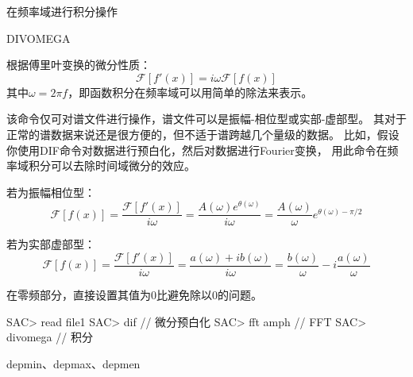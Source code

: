 \label{cmd:divomega}

在频率域进行积分操作

\begin{SACSTX}
DIVOMEGA
\end{SACSTX}

根据傅里叶变换的微分性质：
\[
\mathcal{F}[f'(x)]= i \omega \mathcal{F}[f(x)]
\]
其中$\omega = 2 \pi f $，即函数积分在频率域可以用简单的除法来表示。

该命令仅可对谱文件进行操作，谱文件可以是振幅-相位型或实部-虚部型。
其对于正常的谱数据来说还是很方便的，但不适于谱跨越几个量级的数据。
比如，假设你使用DIF命令对数据进行预白化，然后对数据进行Fourier变换，
用此命令在频率域积分可以去除时间域微分的效应。

若为振幅相位型：
\[
\mathcal{F}[f(x)] = \frac{\mathcal{F}[f'(x)]}{i \omega}
                  = \frac{A(\omega)e^{\theta(\omega)}}{i \omega}
                  = \frac{A(\omega)}{\omega}e^{\theta(\omega)-\pi/2}
\]

若为实部虚部型：
\[
\mathcal{F}[f(x)] = \frac{\mathcal{F}[f'(x)]}{i \omega}
                  = \frac{a(\omega)+ib(\omega)}{i \omega}
                  = \frac{b(\omega)}{\omega}-i\frac{a(\omega)}{\omega}
\]

在零频部分，直接设置其值为0比避免除以0的问题。

\begin{SACCode}
SAC> read file1
SAC> dif                // 微分预白化
SAC> fft amph           // FFT
SAC> divomega           // 积分
\end{SACCode}

depmin、depmax、depmen
